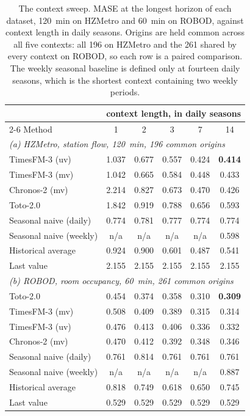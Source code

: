 \documentclass[11pt]{article}
\theoremstyle{plain}
\theoremstyle{definition}
\theoremstyle{remark}
\newcommand{\best}[1]{\textbf{#1}}
\newif\ifrevisionmarkup
\newcommand{\new}[1]{\ifrevisionmarkup\textcolor{revision}{#1}\else#1\fi}
\begin{document}
\new{\begin{table}[htbp]
\centering
\caption{\new{The context sweep. MASE at the longest horizon of each dataset, \SI{120}{\minute} on HZMetro and \SI{60}{\minute} on ROBOD, against context length in daily seasons. Origins are held common across all five contexts: all \num{196} on HZMetro and the \num{261} shared by every context on ROBOD, so each row is a paired comparison. The weekly seasonal baseline is defined only at fourteen daily seasons, which is the shortest context containing two weekly periods.}}
\label{tab:sweep}
\small
\begin{tabular}{lccccc}
\toprule
& \multicolumn{5}{c}{context length, in daily seasons}\\
\cmidrule(lr){2-6}
Method & 1 & 2 & 3 & 7 & 14 \\
\midrule
\multicolumn{6}{l}{\emph{(a) HZMetro, station flow, \SI{120}{\minute}, \num{196} common origins}}\\
TimesFM-3 (uv)         & 1.037 & 0.677 & 0.557 & 0.424 & \best{0.414} \\
TimesFM-3 (mv)         & 1.042 & 0.665 & 0.584 & 0.448 & 0.433 \\
Chronos-2 (mv)         & 2.214 & 0.827 & 0.673 & 0.470 & 0.426 \\
Toto-2.0               & 1.842 & 0.919 & 0.788 & 0.656 & 0.593 \\
\midrule
Seasonal naive (daily) & 0.774 & 0.781 & 0.777 & 0.774 & 0.774 \\
\new{Seasonal naive (weekly)} & n/a & n/a & n/a & n/a & 0.598 \\
Historical average     & 0.924 & 0.900 & 0.601 & 0.487 & 0.541 \\
Last value             & 2.155 & 2.155 & 2.155 & 2.155 & 2.155 \\
\midrule
\multicolumn{6}{l}{\emph{(b) ROBOD, room occupancy, \SI{60}{\minute}, \num{261} common origins}}\\
Toto-2.0               & 0.454 & 0.374 & 0.358 & 0.310 & \best{0.309} \\
TimesFM-3 (mv)         & 0.508 & 0.409 & 0.389 & 0.315 & 0.314 \\
TimesFM-3 (uv)         & 0.476 & 0.413 & 0.406 & 0.336 & 0.332 \\
Chronos-2 (mv)         & 0.470 & 0.412 & 0.392 & 0.348 & 0.346 \\
\midrule
Seasonal naive (daily) & 0.761 & 0.814 & 0.761 & 0.761 & 0.761 \\
\new{Seasonal naive (weekly)} & n/a & n/a & n/a & n/a & 0.887 \\
Historical average     & 0.818 & 0.749 & 0.618 & 0.650 & 0.745 \\
Last value             & 0.529 & 0.529 & 0.529 & 0.529 & 0.529 \\
\bottomrule
\end{tabular}
\end{table}}
\end{document}
